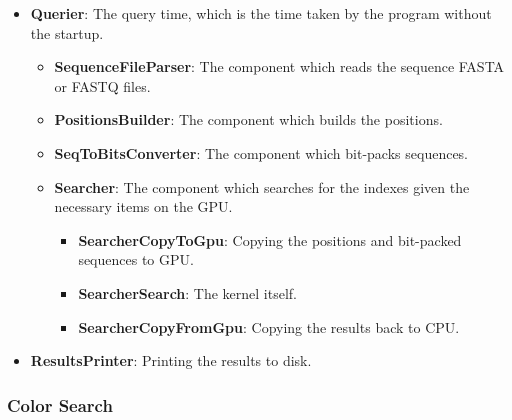 \begin{itemize}
\begin{itemize}
    \item \textbf{Querier}: The query time, which is the time taken by the program without the startup.
    \begin{itemize}
      \item \textbf{SequenceFileParser}: The component which reads the sequence FASTA or FASTQ files.
      \item \textbf{PositionsBuilder}: The component which builds the positions.
      \item \textbf{SeqToBitsConverter}: The component which bit-packs sequences.
      \item \textbf{Searcher}: The component which searches for the indexes given the necessary items on the GPU.
      \begin{itemize}
        \item \textbf{SearcherCopyToGpu}: Copying the positions and bit-packed sequences to GPU.
        \item \textbf{SearcherSearch}: The kernel itself.
        \item \textbf{SearcherCopyFromGpu}: Copying the results back to CPU.
      \end{itemize}
    \end{itemize}
    \item \textbf{ResultsPrinter}: Printing the results to disk.
  \end{itemize}
\end{itemize}

\subsubsection{Color Search}

